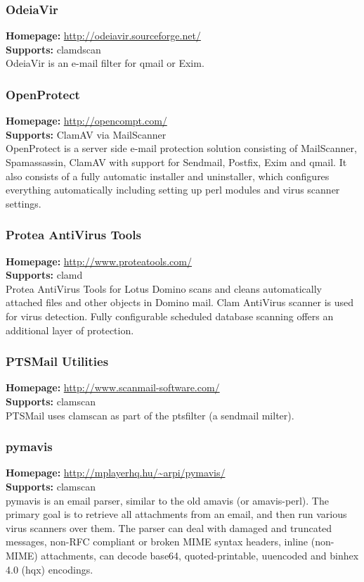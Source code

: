 \documentclass[a4paper,titlepage,12pt]{article}
\begin{document}
    \subsubsection{OdeiaVir}
    \textbf{Homepage:} \url{http://odeiavir.sourceforge.net/}\\
    \textbf{Supports:} clamdscan\\[4pt]
    OdeiaVir is an e-mail filter for qmail or Exim.

    \subsubsection{OpenProtect}
    \textbf{Homepage:} \url{http://opencompt.com/}\\
    \textbf{Supports:} ClamAV via MailScanner\\[4pt]
    OpenProtect is a server side e-mail protection solution consisting of
    MailScanner, Spamassassin, ClamAV with support for Sendmail, Postfix,
    Exim and qmail. It also consists of a fully automatic installer and
    uninstaller, which configures everything automatically including
    setting up perl modules and virus scanner settings. 

    \subsubsection{Protea AntiVirus Tools}
    \textbf{Homepage:} \url{http://www.proteatools.com/}\\
    \textbf{Supports:} clamd\\[4pt]
    Protea AntiVirus Tools for Lotus Domino scans and cleans automatically
    attached files and other objects in Domino mail. Clam AntiVirus scanner
    is used for virus detection. Fully configurable scheduled database scanning
    offers an additional layer of protection.

    \subsubsection{PTSMail Utilities}
    \textbf{Homepage:} \url{http://www.scanmail-software.com/}\\
    \textbf{Supports:} clamscan\\[4pt]
    PTSMail uses clamscan as part of the ptsfilter (a sendmail milter).

    \subsubsection{pymavis}
    \textbf{Homepage:} \url{http://mplayerhq.hu/~arpi/pymavis/}\\
    \textbf{Supports:} clamscan\\[4pt]
    pymavis is an email parser, similar to the old amavis (or amavis-perl). The
    primary goal is to retrieve all attachments from an email, and then run
    various virus scanners over them. The parser can deal with damaged and
    truncated messages, non-RFC compliant or broken MIME syntax headers,
    inline (non-MIME) attachments, can decode base64, quoted-printable,
    uuencoded and binhex 4.0 (hqx) encodings.
\end{document}
